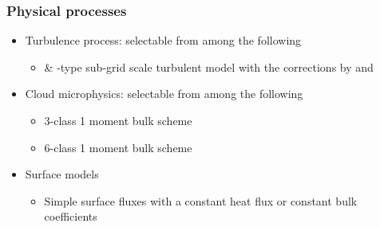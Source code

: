 \subsubsection{Physical processes}
\begin{itemize}
\item Turbulence process: selectable from among the following
  \begin{itemize}
  \item \citet{smagorinsky1963general} \& \citet{lilly1962numerical}-type sub-grid scale turbulent model
    with the corrections by \citet{brown1994largeeddy} and \citet{Scotti_1993}
  \end{itemize}
\item Cloud microphysics: selectable from among the following
  \begin{itemize}
  \item 3-class 1 moment bulk scheme \citep{kessler_1969}
  \item 6-class 1 moment bulk scheme \citep{tomita_2008}
  \end{itemize}
\item Surface models
  \begin{itemize}
    \item Simple surface fluxes with a constant heat flux or constant bulk coefficients
  \end{itemize}
\end{itemize}
